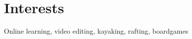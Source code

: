\documentclass[11pt,a4paper,sans]{moderncv}        %
\begin{document}
\section{Interests}
Online learning, video editing, kayaking, rafting, boardgames


% 
% 
\end{document}
